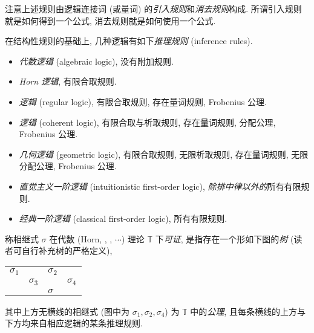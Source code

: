 \begin{remark}
	{}
	注意上述规则由逻辑连接词 (或量词) 的\emph{引入规则}和\emph{消去规则}构成. 所谓引入规则就是如何得到一个公式, 消去规则就是如何使用一个公式.
\end{remark}


\begin{definition}
	[label={inference-rules}]
	{}
	在结构性规则的基础上, 几种逻辑有如下\emph{推理规则} (inference rules).
	\begin{itemize}
		\item \emph{代数逻辑} (algebraic logic), 没有附加规则.
		\item \emph{Horn 逻辑}, 有限合取规则.
		\item \emph{\regular{}逻辑} (regular logic), 有限合取规则, 存在量词规则, Frobenius 公理.
		\item \emph{\coherent{}逻辑} (coherent logic), 有限合取与析取规则, 存在量词规则, 分配公理, Frobenius 公理.
		\item \emph{几何逻辑} (geometric logic), 有限合取规则, 无限析取规则, 存在量词规则, 无限分配公理, Frobenius 公理.
		\item \emph{直觉主义一阶逻辑} (intuitionistic first-order logic), \emph{除排中律以外的}所有有限规则.
		\item \emph{经典一阶逻辑} (classical first-order logic), 所有有限规则.
	\end{itemize}
\end{definition}

\begin{definition}
	[label={first-order-provability}]
	{}
	称相继式 $\sigma$ 在代数 (Horn, \regular{}, \coherent{}, $\cdots$) 理论 $\mathbb T$ 下\emph{可证},
	是指存在一个形如下图的\emph{树} (读者可自行补充树的严格定义),
	\begin{center}
		\begin{tabular}{llll}
			$\sigma_1$ &            & $\sigma_2$ &            \\ \cline{1-3}
			& $\sigma_3$ &            & $\sigma_4$ \\ \cline{2-4} 
			&            & $\sigma$ &           
		\end{tabular}
	\end{center}
	其中上方无横线的相继式 (图中为 $\sigma_1,\sigma_2,\sigma_4$) 为 $\mathbb T$ 中的\emph{公理}, 且每条横线的上方与下方均来自相应逻辑的某条推理规则.
\end{definition}

